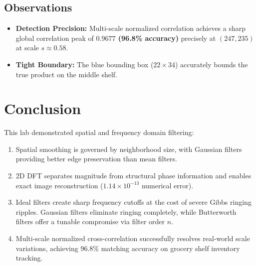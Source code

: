 \documentclass[12pt]{article}
\begin{document}
\subsection{Observations}
\begin{itemize}
    \item \textbf{Detection Precision:} Multi-scale normalized correlation achieves a sharp global correlation peak of \textbf{$0.9677$ (96.8\% accuracy)} precisely at $(247, 235)$ at scale $s \approx 0.58$.
    \item \textbf{Tight Boundary:} The blue bounding box ($22 \times 34$) accurately bounds the true product on the middle shelf.
\end{itemize}

\section{Conclusion}
This lab demonstrated spatial and frequency domain filtering:
\begin{enumerate}
    \item Spatial smoothing is governed by neighborhood size, with Gaussian filters providing better edge preservation than mean filters.
    \item 2D DFT separates magnitude from structural phase information and enables exact image reconstruction ($1.14 \times 10^{-13}$ numerical error).
    \item Ideal filters create sharp frequency cutoffs at the cost of severe Gibbs ringing ripples. Gaussian filters eliminate ringing completely, while Butterworth filters offer a tunable compromise via filter order $n$.
    \item Multi-scale normalized cross-correlation successfully resolves real-world scale variations, achieving $96.8\%$ matching accuracy on grocery shelf inventory tracking.
\end{enumerate}
\end{document}
